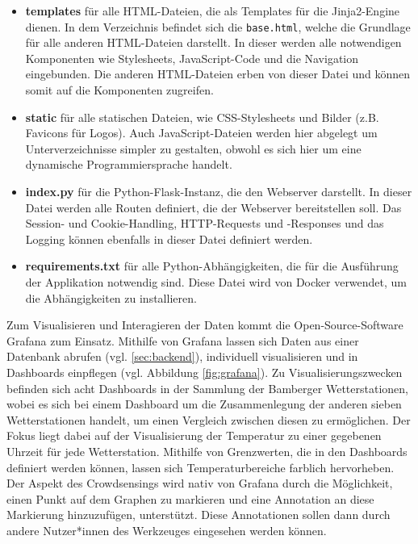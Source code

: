 \begin{itemize}
    \item \textbf{templates} für alle HTML-Dateien, die als Templates für die Jinja2-Engine dienen. In dem Verzeichnis befindet sich die \texttt{base.html}, welche die Grundlage für alle anderen HTML-Dateien darstellt. In dieser werden alle notwendigen Komponenten wie Stylesheets, JavaScript-Code und die Navigation eingebunden. Die anderen HTML-Dateien erben von dieser Datei und können somit auf die Komponenten zugreifen.
    \item \textbf{static} für alle statischen Dateien, wie CSS-Stylesheets und Bilder (z.B. Favicons für Logos). Auch JavaScript-Dateien werden hier abgelegt um Unterverzeichnisse simpler zu gestalten, obwohl es sich hier um eine dynamische Programmiersprache handelt.
    \item \textbf{index.py} für die Python-Flask-Instanz, die den Webserver darstellt. In dieser Datei werden alle Routen definiert, die der Webserver bereitstellen soll. Das Session- und Cookie-Handling, HTTP-Requests und -Responses und das Logging können ebenfalls in dieser Datei definiert werden.
    \item \textbf{requirements.txt} für alle Python-Abhängigkeiten, die für die Ausführung der Applikation notwendig sind. Diese Datei wird von Docker verwendet, um die Abhängigkeiten zu installieren.
\end{itemize}

Zum Visualisieren und Interagieren der Daten kommt die Open-Source-Software Grafana zum Einsatz. Mithilfe von Grafana lassen sich Daten aus einer Datenbank abrufen (vgl. \ref{sec:backend}), individuell visualisieren und in Dashboards einpflegen (vgl. Abbildung \ref{fig:grafana}). Zu Visualisierungszwecken befinden sich acht Dashboards in der Sammlung der Bamberger Wetterstationen, wobei es sich bei einem Dashboard um die Zusammenlegung der anderen sieben Wetterstationen handelt, um einen Vergleich zwischen diesen zu ermöglichen. Der Fokus liegt dabei auf der Visualisierung der Temperatur zu einer gegebenen Uhrzeit für jede Wetterstation. Mithilfe von Grenzwerten, die in den Dashboards definiert werden können, lassen sich Temperaturbereiche farblich hervorheben. Der Aspekt des Crowdsensings wird nativ von Grafana durch die Möglichkeit, einen Punkt auf dem Graphen zu markieren und eine Annotation an diese Markierung hinzuzufügen, unterstützt. Diese Annotationen sollen dann durch andere Nutzer*innen des Werkzeuges eingesehen werden können.

